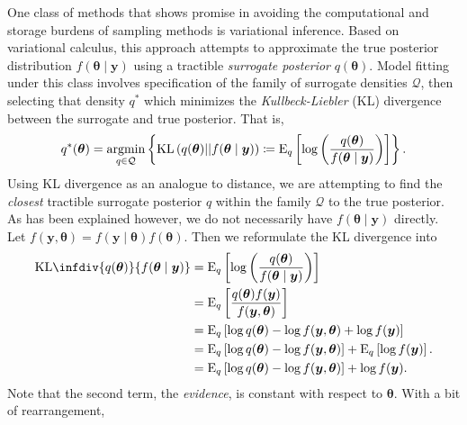 One class of methods that shows promise in avoiding the computational and 
    storage burdens of sampling methods is variational inference.\needcite 
    Based on variational calculus, this approach attempts to approximate the 
    true posterior distribution
    $f(\bm{\theta}\mid\bm{y})$ using a tractible \emph{surrogate posterior} 
    $q(\bm{\theta})$.  Model fitting under this class involves specification of 
    the family of surrogate densities $\mathcal{Q}$, then selecting that density 
    $q^*$ which minimizes the \emph{Kullbeck-Liebler} (KL) divergence between 
    the surrogate and true posterior.  That is,
    \[
        q^*(\bm{\theta}) = \operatorname*{argmin}_{q\in\mathcal{Q}}\left\lbrace
        \text{KL}\left(q(\bm{\theta})||f(\bm{\theta}\mid\bm{y})\right) 
        \coloneqq
        \text{E}_{q}\left[\log\left(
        \frac{q(\bm{\theta})}{f(\bm{\theta}\mid\bm{y})}
        \right)\right]
        \right\rbrace.
    \]
    Using KL divergence as an analogue to distance, we are attempting to find
    the \emph{closest} tractible surrogate posterior $q$ within the family 
    $\mathcal{Q}$ to the true posterior.
    As has been explained however, we do not necessarily have 
    $f(\bm{\theta}\mid\bm{y})$ directly.  Let 
    $f(\bm{y},\bm{\theta}) = f(\bm{y}\mid\bm{\theta})f(\bm{\theta})$.
    Then we reformulate the KL divergence into
    \[
        \begin{aligned}
        \text{KL}\infdiv{q(\bm{\theta})}{f(\bm{\theta}\mid\bm{y})}
            &=\text{E}_{q}\left[\log\left(
                \frac{q(\bm{\theta})}{f(\bm{\theta}\mid\bm{y})}
                \right)\right]\\
            &= \text{E}_{q}\left[
                \frac{q(\bm{\theta})f(\bm{y})}{f(\bm{y},\bm{\theta})}
                \right]\\
            &= \text{E}_{q}\left[
                \log q(\bm{\theta}) - \log f(\bm{y},\bm{\theta}) 
                + \log f(\bm{y})
                \right]\\
            &= \text{E}_{q}\left[
                \log q(\bm{\theta}) - \log f(\bm{y},\bm{\theta})\right] + 
                    \text{E}_{q}\left[\log f(\bm{y})\right].\\
            &= \text{E}_{q}\left[
                \log q(\bm{\theta}) - \log f(\bm{y},\bm{\theta})\right] + 
                   \log f(\bm{y}).
        \end{aligned}
    \]
    Note that the second term, the \emph{evidence}, is constant with respect to 
    $\bm{\theta}$.  With a bit of rearrangement,
